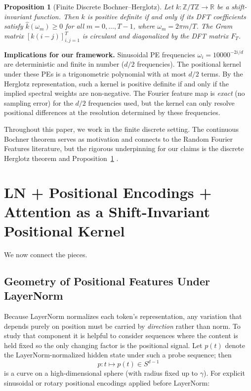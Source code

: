 \documentclass[11pt]{article}
\newtheorem{proposition}[theorem]{Proposition}
\theoremstyle{definition}
\begin{document}
\begin{proposition}[Finite Discrete Bochner--Herglotz]
\label{prop:discrete-bochner}
Let $k : \mathbb{Z}/T\mathbb{Z} \to \mathbb{R}$ be a shift-invariant function. Then $k$ is positive definite if and only if its DFT coefficients satisfy $\hat{k}(\omega_m) \geq 0$ for all $m = 0, \ldots, T-1$, where $\omega_m = 2\pi m / T$. The Gram matrix $[k(i-j)]_{i,j=1}^T$ is circulant and diagonalized by the DFT matrix $F_T$.
\end{proposition}

\noindent
\textbf{Implications for our framework.} Sinusoidal PE frequencies $\omega_i = 10000^{-2i/d}$ are deterministic and finite in number ($d/2$ frequencies). The positional kernel under these PEs is a trigonometric polynomial with at most $d/2$ terms. By the Herglotz representation, such a kernel is positive definite if and only if the implied spectral weights are non-negative. The Fourier feature map is \emph{exact} (no sampling error) for the $d/2$ frequencies used, but the kernel can only resolve positional differences at the resolution determined by these frequencies.

Throughout this paper, we work in the finite discrete setting. The continuous Bochner theorem serves as motivation and connects to the Random Fourier Features literature, but the rigorous underpinning for our claims is the discrete Herglotz theorem and Proposition~\ref{prop:discrete-bochner} \cite{katznelson2004harmonic}.

\section{LN + Positional Encodings + Attention as a Shift-Invariant Positional Kernel}
\label{sec:synthesis}

We now connect the pieces.

\subsection{Geometry of Positional Features Under LayerNorm}

Because LayerNorm normalizes each token's representation, any variation that depends purely on position must be carried by \emph{direction} rather than norm. To study that component it is helpful to consider sequences where the content is held fixed so the only changing factor is the positional signal. Let \(p(t)\) denote the LayerNorm-normalized hidden state under such a probe sequence; then
\[
p : t \mapsto p(t) \in S^{d-1}
\]
is a curve on a high-dimensional sphere (with radius fixed up to \(\gamma\)). For explicit sinusoidal or rotary positional encodings applied before LayerNorm:
\end{document}
